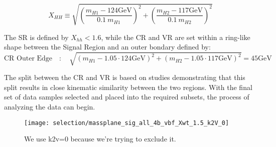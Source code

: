         \begin{equation}
            X_{HH} \equiv \sqrt{\left(\frac{m_{H1} - 124\textrm{GeV}}{0.1 \ m_{H1}}\right)^{2}
                + \left(\frac{m_{H2} - 117\textrm{GeV}}{0.1 \ m_{H2}}\right)^{2}}
            \label{eq:xhh}
        \end{equation}
        
        The SR is defined by $X_{hh} < 1.6$,
            while the CR and VR are set within a ring-like shape between the Signal Region
            and an outer bondary defined by:
        \begin{equation}
            \text{CR\ Outer\ Edge} \quad : \quad \sqrt{ \left(m_{H1} - 1.05 \cdot 124\textrm{GeV}\right)^2
                +  \left(m_{H2} - 1.05 \cdot 117\textrm{GeV}\right)^2 } = 45\textrm{GeV}
            \label{eq:cr_out}
        \end{equation}
        
        The split between the CR and VR is based on studies demonstrating that this split results in
            close kinematic similarity between the two regions.
        With the final set of data samples selected and placed into the required subsets, 
            the process of analyzing the data can begin.

        \begin{figure}[tbh]
            \texttt{[image: selection/massplane\_sig\_all\_4b\_vbf\_Xwt\_1.5\_k2V\_0]}
            \caption{
                We use k2v=0 because we're trying to exclude it.\cite{hh4b_2021_int_note}
            }
            \label{fig:region_definition}
        \end{figure}






